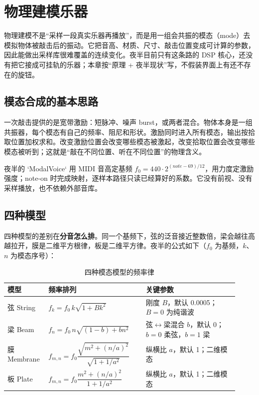\chapter{物理建模乐器}
\label{chap:physical-modeling}


物理建模不是“采样一段真实乐器再播放”，而是用一组会共振的模态（mode）去模拟物体被敲击后的振动。它把音高、材质、尺寸、敲击位置变成可计算的参数，因此能做出采样库很难覆盖的连续变化。夜半目前只有这条路的 DSP 核心，还没有把它接成可挂轨的乐器；本章按“原理 + 夜半现状”写，不假装界面上有还不存在的旋钮。

\section{模态合成的基本思路}

一次敲击提供的是宽带激励：短脉冲、噪声 burst，或两者混合。物体本身是一组共振器，每个模态有自己的频率、阻尼和形状。激励同时进入所有模态，输出按拾取位置加权求和。改变激励位置会改变哪些模态被激起，改变拾取位置会改变哪些模态被听到；这就是“敲在不同位置、听在不同位置”的物理含义。

夜半的 `ModalVoice` 用 MIDI 音高定基频 $f_0 = 440\cdot2^{(note-69)/12}$，用力度定激励强度；note-on 时完成映射，逐样本路径只读已经算好的系数。它没有前视、没有采样播放，也不依赖外部音库。

\section{四种模型}

四种模型的差别在\textbf{分音怎么排}。同一个基频下，弦的泛音接近整数倍，梁会越往高越拉开，膜是二维平方根律，板是二维平方律。夜半的公式如下（$f_0$ 为基频，$k$、$n$ 为模态序号）：

\begin{table}[htbp]
\centering
\small
\begin{tabular}{@{}p{0.14\linewidth}p{0.40\linewidth}p{0.38\linewidth}@{}}
\hline
模型 & 频率排列 & 关键参数 \\
\hline
弦 String & $f_k=f_0\,k\sqrt{1+B k^2}$ & 刚度 $B$，默认 0.0005；$B=0$ 为纯谐波 \\
梁 Beam & $f_n=f_0\,n\sqrt{(1-b)+b n^2}$ & 弦$\leftrightarrow$梁混合 $b$，默认 0；$b=0$ 柔弦，$b=1$ 梁 \\
膜 Membrane & $f_{m,n}=f_0\dfrac{\sqrt{m^2+(n/a)^2}}{\sqrt{1+1/a^2}}$ & 纵横比 $a$，默认 1；二维模态 \\
板 Plate & $f_{m,n}=f_0\dfrac{m^2+(n/a)^2}{1+1/a^2}$ & 纵横比 $a$，默认 1；二维模态 \\
\hline
\end{tabular}
\caption{四种模态模型的频率律}
\label{tab:modal-models}
\end{table}

